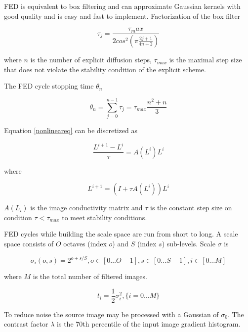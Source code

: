 \documentclass[english,12pt,a4paper,pdftex,elec,utf8, table]{aaltothesis}
\begin{document}
FED is equivalent to box filtering and can approximate Gaussian kernels with good quality and is easy and fast to implement. Factorization of the box filter

\begin{equation}
  \label{boxfilterfactor}
\tau_j = \frac{\tau_max}{2cos^2\left( \pi \frac{2j+1}{4n+2}\right)}
\end{equation}

where $n$ is the number of explicit diffusion steps, $\tau_{max}$ is the maximal step size that does not violate the stability condition of the explicit scheme.

The FED cycle stopping time $\theta_n$

\begin{equation}
\theta_n = \sum_{j=0}^{n-1}\tau_j=\tau_{max}\frac{n^2+n}{3}
\end{equation}

Equation \ref{nonlineareq} can be discretized as

\begin{equation}
  \label{discretenonlineareq}
\frac{L^{i+1}-L^i}{\tau}=A(L^i)L^i
\end{equation}

where

\begin{equation}
  \label{fednextevolution}
  L^{i+1}=(I + \tau A(L^i))L^i
\end{equation}

$A(L_i)$ is the image conductivity matrix and $\tau$ is the constant step size on condition $\tau < \tau_{max}$ to meet stability conditions.

FED cycles while building the scale space are run from short to long. A scale space consists of $O$ octaves (index $o$) and $S$ (index $s$) sub-levels. Scale $\sigma$ is

\begin{equation}
  \label{scalespace}
  \sigma_i(o,s) = 2^{o+s/S},o \in[0\ldots O-1], s \in [0\ldots S-1], i \in [0 \ldots M]
  \end{equation}

where $M$ is the total number of filtered images.

\begin{equation}
  \label{scaletotime}
t_i = \frac{1}{2}\sigma^2_i,\{i=0\ldots M\}
\end{equation}

To reduce noise the source image may be processed with a Gaussian of $\sigma_0$. The contrast factor $\lambda$ is the 70th percentile of the input image gradient histogram.
\end{document}
